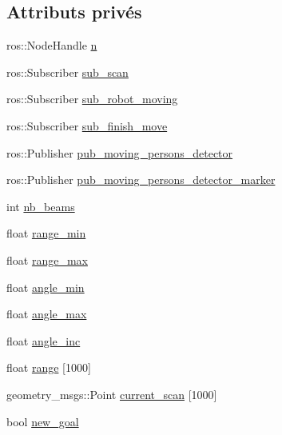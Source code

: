 \subsection*{Attributs privés}
\begin{DoxyCompactItemize}
\item 
ros\+::\+Node\+Handle \hyperlink{classmoving__persons__detector_ac7ce090922b1fbb39792fe80249c2ac7}{n}
\item 
ros\+::\+Subscriber \hyperlink{classmoving__persons__detector_a4927f845c4631be26ced13aa0f306161}{sub\+\_\+scan}
\item 
ros\+::\+Subscriber \hyperlink{classmoving__persons__detector_a2ebd9075ece54b52335ba5aa7c7e073e}{sub\+\_\+robot\+\_\+moving}
\item 
ros\+::\+Subscriber \hyperlink{classmoving__persons__detector_a212ab693f8f575f3770d76efd51bb215}{sub\+\_\+finish\+\_\+move}
\item 
ros\+::\+Publisher \hyperlink{classmoving__persons__detector_a76a32d740a76752eb8d806ed50f1dbdd}{pub\+\_\+moving\+\_\+persons\+\_\+detector}
\item 
ros\+::\+Publisher \hyperlink{classmoving__persons__detector_adb07f5fa4d75d6c8f2e037a9b9e38e7a}{pub\+\_\+moving\+\_\+persons\+\_\+detector\+\_\+marker}
\item 
int \hyperlink{classmoving__persons__detector_ad6c97c267707ec5b67e3295899ccb40d}{nb\+\_\+beams}
\item 
float \hyperlink{classmoving__persons__detector_a92cf37109057a74bd655a7d4366c29e4}{range\+\_\+min}
\item 
float \hyperlink{classmoving__persons__detector_a93be1d4fd3177968890c7e8917f047ab}{range\+\_\+max}
\item 
float \hyperlink{classmoving__persons__detector_a57cb7dfbf0b886b6cfb87c0c9f9e4cf1}{angle\+\_\+min}
\item 
float \hyperlink{classmoving__persons__detector_acc6274815996d0b9e2882df73d951a17}{angle\+\_\+max}
\item 
float \hyperlink{classmoving__persons__detector_a87b53ed0ee82616d481cb0b68351f971}{angle\+\_\+inc}
\item 
float \hyperlink{classmoving__persons__detector_a07152a36a51361a3f7b7ebdf9cf809c1}{range} \mbox{[}1000\mbox{]}
\item 
geometry\+\_\+msgs\+::\+Point \hyperlink{classmoving__persons__detector_a8e17523454477a9e7ed1e87c9f42816b}{current\+\_\+scan} \mbox{[}1000\mbox{]}
\item 
bool \hyperlink{classmoving__persons__detector_a49ade373e545c987b519a7c2e686820c}{new\+\_\+goal}

\end{DoxyCompactItemize}
